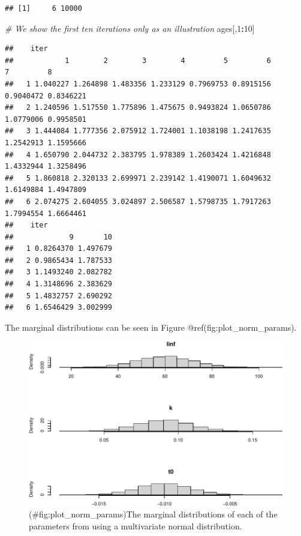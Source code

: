 \documentclass[
]{book}
\newenvironment{Shaded}{\begin{snugshade}}{\end{snugshade}}
\newcommand{\CommentTok}[1]{\textcolor[rgb]{0.56,0.35,0.01}{\textit{#1}}}
\newcommand{\DecValTok}[1]{\textcolor[rgb]{0.00,0.00,0.81}{#1}}
\newcommand{\NormalTok}[1]{#1}
\newcommand{\SpecialCharTok}[1]{\textcolor[rgb]{0.81,0.36,0.00}{\textbf{#1}}}
\begin{document}
\begin{verbatim}
## [1]     6 10000
\end{verbatim}

\begin{Shaded}
\begin{Highlighting}[]
\CommentTok{\# We show the first ten iterations only as an illustration}
\NormalTok{ages[,}\DecValTok{1}\SpecialCharTok{:}\DecValTok{10}\NormalTok{]}
\end{Highlighting}
\end{Shaded}

\begin{verbatim}
##    iter
##            1        2        3        4         5         6         7         8
##   1 1.040227 1.264898 1.483356 1.233129 0.7969753 0.8915156 0.9040472 0.8346221
##   2 1.240596 1.517550 1.775896 1.475675 0.9493824 1.0650786 1.0779006 0.9958501
##   3 1.444084 1.777356 2.075912 1.724001 1.1038198 1.2417635 1.2542913 1.1595666
##   4 1.650790 2.044732 2.383795 1.978389 1.2603424 1.4216848 1.4332944 1.3258496
##   5 1.860818 2.320133 2.699971 2.239142 1.4190071 1.6049632 1.6149884 1.4947809
##   6 2.074275 2.604055 3.024897 2.506587 1.5798735 1.7917263 1.7994554 1.6664461
##    iter
##             9       10
##   1 0.8264370 1.497679
##   2 0.9865434 1.787533
##   3 1.1493240 2.082782
##   4 1.3148696 2.383629
##   5 1.4832757 2.690292
##   6 1.6546429 3.002999
\end{verbatim}

The marginal distributions can be seen in Figure @ref(fig:plot\_norm\_params).

\begin{figure}
\centering
\includegraphics{_main_files/figure-latex/plot_norm_params-1.pdf}
\caption{(\#fig:plot\_norm\_params)The marginal distributions of each of the parameters from using a multivariate normal distribution.}
\end{figure}
\end{document}

